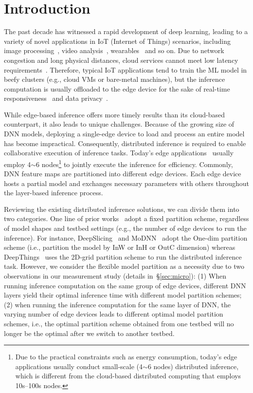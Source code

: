 \section{Introduction}
The past decade has witnessed a rapid development of deep learning, leading to a variety of novel applications in IoT (Internet of Things) scenarios, including image processing~\cite{abdel2020image,hu2017iot}, video analysis~\cite{long2017edge}, wearables~\cite{bi2019ramt} and so on. Due to network congestion and long physical distances, cloud services cannot meet low latency requirements~\cite{liu2023joint}. Therefore, typical IoT applications tend to train the ML model in beefy clusters (e.g., cloud VMs or bare-metal machines), but the inference computation is usually offloaded to the edge device for the sake of real-time responsiveness~\cite{zhou2019adaptive,chen2024edgeci} and data privacy~\cite{dhar2022studying}. 

While edge-based inference offers more timely results than its cloud-based counterpart, it also leads to unique challenges. Because of the growing size of DNN models, deploying a single-edge device to load and process an entire model has become impractical. Consequently, distributed inference is required to enable collaborative execution of inference tasks. Today's edge applications~\cite{zhang2021deepslicing,zhao2018deepthings,mohammed2020distributed,dey2019embedded} usually employ 4$\sim$6 nodes\footnote{Due to the practical constraints such as energy consumption, today's edge applications usually conduct small-scale (4$\sim$6 nodes) distributed inference, which is different from the cloud-based distributed computing that employs 10s--100s nodes.} to jointly execute the inference for efficiency. Commonly, DNN feature maps are partitioned into different edge devices. Each edge device hosts a partial model and exchanges necessary parameters with others throughout the layer-based inference process.

Reviewing the existing distributed inference solutions, we can divide them into two categories. One line of prior works~\cite{zhao2018deepthings,zhou2019adaptive,mao2017modnn} adopt a fixed partition scheme, regardless of model shapes and testbed settings (e.g., the number of edge devices to run the inference). For instance, DeepSlicing~\cite{zhang2021deepslicing} and MoDNN~\cite{mao2017modnn} adopt the One-dim partition scheme (i.e., partition the model by InW or InH or OutC dimension) whereas DeepThings~\cite{zhao2018deepthings} uses the 2D-grid partition scheme to run the distributed inference task. However, we consider the flexible model partition as a necessity due to two observations in our measurement study (details in~\S\ref{sec:micro}): (1) When running inference computation on the same group of edge devices, different DNN layers yield their optimal inference time with different model partition schemes; (2) when running the inference computation for the same layer of DNN, the varying number of edge devices leads to different optimal model partition schemes, i.e., the optimal partition scheme obtained from one testbed will no longer be the optimal after we switch to another testbed. 

